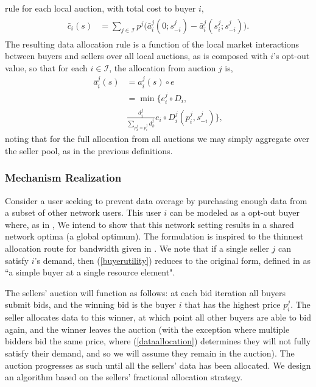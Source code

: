 \documentclass[12pt]{article}
\theoremstyle{definition}
\newcommand{\mcI}{\mathcal{I}}
\begin{document}
\begin{multicols}{2}
rule for each local auction, with total cost to buyer $i$,
\begin{align}\label{datacost}
\begin{split}
    \bar{c}_i(s) &= \displaystyle\sum_{j\in\mcI} 
p^j \bigg(\bar{a}_i^j(0; s_{-i}^j)
    -\bar{a}_i^j(s_i^j;s_{-i}^j)\bigg).
\end{split}
\end{align}
The resulting data allocation rule is a function of the local market
interactions between buyers and sellers over all local auctions, as is composed with $i$'s opt-out value, so that for each $i \in \mcI$, the
allocation from auction $j$ is,
\begin{align}\label{dataallocation}
    \bar{a}_i^j(s) &= a_i^j(s) \circ e \\
    &= \min\bigg\lbrace e_i^j \circ D_i, \\
    &\frac{d_i^j}{\sum_{p_k^j= p_i^j}d_k^j} e_i \circ
D_i^j(p_i^j,s_{-i}^j)\bigg\rbrace,
\end{align}
noting that for the full allocation from all auctions we may simply aggregate
over the seller pool, as in the previous definitions.


\subsubsection{Mechanism Realization}\label{realization}

Consider a user seeking to prevent
data overage by purchasing enough data from a subset of other network users.
This user $i$ can be modeled as a opt-out buyer where, as in \cite{semret},
We intend to show that this network setting results in a shared network optima (a
global optimum). The formulation is inspired to the thinnest allocation route for
bandwidth given in \cite{lazar}. We note that if a single seller $j$ can
satisfy $i$'s demand, then
(\ref{buyerutility}) reduces to the original form, defined in
\cite{semret} as ``a simple buyer at a single resource element".

The sellers' auction will function as follows: at each bid iteration all buyers
submit bids, and the winning bid is the buyer $i$ that has the highest price
$p_i^j$. The seller allocates
data to this winner, at which point all other buyers are able to bid again, and
the winner leaves the auction (with the exception where multiple bidders bid
the same price, where (\ref{dataallocation}) determines they will not fully
satisfy their demand, and so we will assume they remain in the auction). The auction progresses as such until all the
sellers' data has been allocated. We design an algorithm based on the sellers'
fractional allocation strategy.


\end{multicols}
\end{document}
